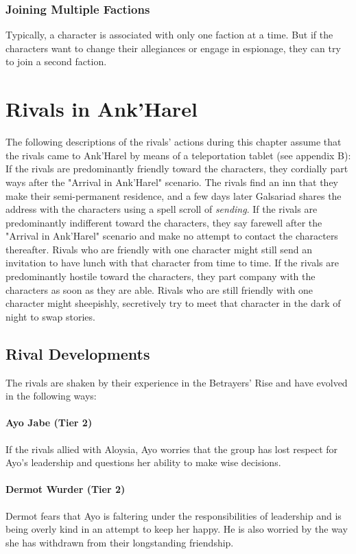 \documentclass[10pt,a4,twoside,twocolumn,openany,nodeprecatedcode]{dndbook}
\begin{document}
\subsubsection{Joining Multiple Factions}
Typically, a character is associated with only one faction at a time. But if the characters want to change their allegiances or engage in espionage, they can try to join a second faction.
\section{Rivals in Ank'Harel}
The following descriptions of the rivals' actions during this chapter assume that the rivals came to Ank'Harel by means of a teleportation tablet (see appendix B):
{{If the rivals are predominantly friendly toward the characters, they cordially part ways after the "Arrival in Ank'Harel" scenario. The rivals find an inn that they make their semi-permanent residence, and a few days later Galsariad shares the address with the characters using a spell scroll of \textit{sending}.}}
{{If the rivals are predominantly indifferent toward the characters, they say farewell after the "Arrival in Ank'Harel" scenario and make no attempt to contact the characters thereafter. Rivals who are friendly with one character might still send an invitation to have lunch with that character from time to time.}}
{{If the rivals are predominantly hostile toward the characters, they part company with the characters as soon as they are able. Rivals who are still friendly with one character might sheepishly, secretively try to meet that character in the dark of night to swap stories.}}
\subsection{Rival Developments}
The rivals are shaken by their experience in the Betrayers' Rise and have evolved in the following ways:
\paragraph{Ayo Jabe (Tier 2)}
If the rivals allied with Aloysia, Ayo worries that the group has lost respect for Ayo's leadership and questions her ability to make wise decisions.
\paragraph{Dermot Wurder (Tier 2)}
Dermot fears that Ayo is faltering under the responsibilities of leadership and is being overly kind in an attempt to keep her happy. He is also worried by the way she has withdrawn from their longstanding friendship.
\end{document}
